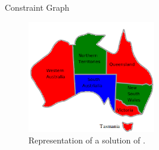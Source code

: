 \begin{frame}{Constraint Graph}
\begin{minipage}{0.5\textwidth}
        \begin{figure}
            \centering
            \includegraphics[width=0.5\textwidth]{src/images/temporal-reasoning/australia-map-colored}
            \caption{Representation of a solution of \CSP{}.}
        \end{figure}
    \end{minipage}
\end{frame}

